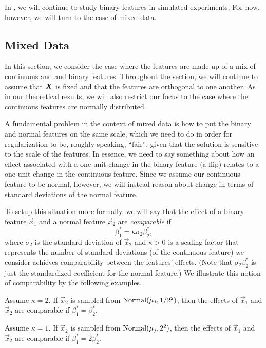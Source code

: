 In , we will continue to study binary features in simulated
experiments. For now, however, we will turn to the case of mixed data.

\subsection{Mixed Data}\label{sec:mixed-data}

In this section, we consider the case where the features are made up of a mix of continuous
and and binary features. Throughout the section, we will continue to assume that
\(\boldsymbol{X}\) is fixed and that the features are orthogonal to one another. As in our
theoretical results, we will also restrict our focus to the case where the continuous
features are normally distributed.

A fundamental problem in the context of mixed data is how to put the binary and normal
features on the same scale, which we need to do in order for regularization to be, roughly
speaking, ``fair'', given that the solution is sensitive to the scale of the features. In
essence, we need to say something about how an effect associated with a one-unit change in
the binary feature (a flip) relates to a one-unit change in the continuous feature. Since
we assume our continuous feature to be normal, however, we will instead reason about change
in terms of standard deviations of the normal feature.

To setup this situation more formally, we will say that the effect of a binary feature
\(\vec{x}_1\) and a normal feature \(\vec{x}_2\) are \emph{comparable} if
\[
  \beta^*_1 = \kappa \sigma_{2}\beta^*_2,
\]
where \(\sigma_2\) is the standard deviation of \(\vec{x}_2\) and \(\kappa > 0\) is a
scaling factor that represents the number of standard deviations (of the continuous
feature) we consider achieves comparability between the features' effects. (Note that
\(\sigma_2 \beta_2^*\) is just the standardized coefficient for the normal feature.) We
illustrate this notion of comparability by the following examples.

\begin{example}
  Assume \(\kappa = 2\). If \(\vec{x}_2\) is sampled from \(\operatorname{Normal}(\mu_j, 1/2^2)\), then the effects of \(\vec{x}_1\) and \(\vec{x}_2\) are comparable if \(\beta_1^* = \beta_2^*\).
\end{example}
\begin{example}
  Assume \(\kappa = 1\). If \(\vec{x}_2\) is sampled from \(\operatorname{Normal}(\mu_j, 2^2)\), then the effects of \(\vec{x}_1\) and \(\vec{x}_2\) are comparable if \(\beta_1^* = 2\beta_2^*\).
\end{example}

